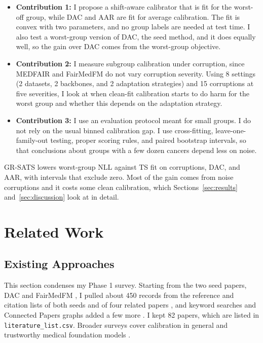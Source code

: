 \documentclass[sigconf,nonacm]{acmart}
\begin{document}
\begin{itemize}
  \item \textbf{Contribution 1:} I propose a shift-aware calibrator that is fit for the worst-off group, while DAC and AAR are fit for average calibration. The fit is convex with two parameters, and no group labels are needed at test time. I also test a worst-group version of DAC, the seed method, and it does equally well, so the gain over DAC comes from the worst-group objective.
  \item \textbf{Contribution 2:} I measure subgroup calibration under corruption, since MEDFAIR and FairMedFM do not vary corruption severity. Using 8 settings (2 datasets, 2 backbones, and 2 adaptation strategies) and 15 corruptions at five severities, I look at when clean-fit calibration starts to do harm for the worst group and whether this depends on the adaptation strategy.
  \item \textbf{Contribution 3:} I use an evaluation protocol meant for small groups. I do not rely on the usual binned calibration gap. I use cross-fitting, leave-one-family-out testing, proper scoring rules, and paired bootstrap intervals, so that conclusions about groups with a few dozen cancers depend less on noise.
\end{itemize}

GR-SATS lowers worst-group NLL against TS fit on corruptions, DAC, and AAR, with intervals that exclude zero. Most of the gain comes from noise corruptions and it costs some clean calibration, which Sections~\ref{sec:results} and~\ref{sec:discussion} look at in detail.

\section{Related Work}
\label{sec:related}

\subsection{Existing Approaches}

This section condenses my Phase 1 survey. Starting from the two seed papers, DAC \cite{tomani2023dac} and FairMedFM \cite{jin2024fairmedfm}, I pulled about 450 records from the reference and citation lists of both seeds and of four related papers \cite{tomani2021posthoc,roschewitz2025where,disalvo2024medmnistc,salvador2022faircal}, and keyword searches and Connected Papers graphs added a few more \cite{hekler2023tta,yang2023beyond,tian2024fairdomain}. I kept 82 papers, which are listed in \texttt{literature\_list.csv}. Broader surveys cover calibration in general \cite{wang2023survey} and trustworthy medical foundation models \cite{shi2024survey}.
\end{document}
